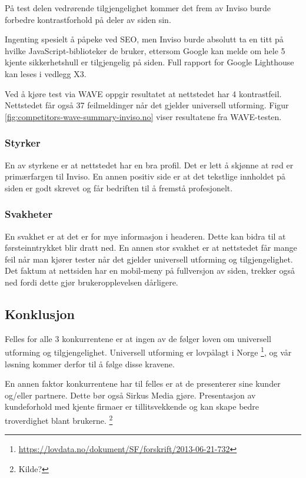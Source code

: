 På test delen vedrørende tilgjengelighet kommer det frem av Inviso burde forbedre kontrastforhold på deler av siden sin.

Ingenting spesielt å påpeke ved SEO, men Inviso burde absolutt ta en titt på hvilke JavaScript-biblioteker de bruker, ettersom Google kan melde om hele 5 kjente sikkerhetshull er tilgjengelig på siden. Full rapport for Google Lighthouse kan leses i vedlegg X3.

Ved å kjøre test via WAVE oppgir resultatet at nettstedet har 4 kontrastfeil. Nettstedet får også 37 feilmeldinger når det gjelder universell utforming. Figur \ref{fig:competitors-wave-summary-inviso.no} viser resultatene fra WAVE-testen.

\subsubsection{Styrker} 
En av styrkene er at nettstedet har en bra profil. Det er lett å skjønne at rød er primærfargen til Inviso. En annen positiv side er at det tekstlige innholdet på siden er godt skrevet og får bedriften til å fremstå profesjonelt.

\subsubsection{Svakheter}
En svakhet er at det er for mye informasjon i headeren. Dette kan bidra til at førsteinntrykket blir dratt ned. En annen stor svakhet er at nettstedet får mange feil når man kjører tester når det gjelder universell utforming og tilgjengelighet. Det faktum at nettsiden har en mobil-meny på fullversjon av siden, trekker også ned fordi dette gjør brukeropplevelsen dårligere.

\subsection{Konklusjon}
Felles for alle 3 konkurrentene er at ingen av de følger loven om universell utforming og tilgjengelighet. Universell utforming er lovpålagt i Norge \footnote{\url{https://lovdata.no/dokument/SF/forskrift/2013-06-21-732}}, og vår løsning kommer derfor til å følge disse kravene. 

En annen faktor konkurrentene har til felles er at de presenterer sine kunder og/eller partnere. Dette bør også Sirkus Media gjøre. Presentasjon av kundeforhold med kjente firmaer er tillitsvekkende og kan skape bedre troverdighet blant brukerne. \footnote{Kilde?}


